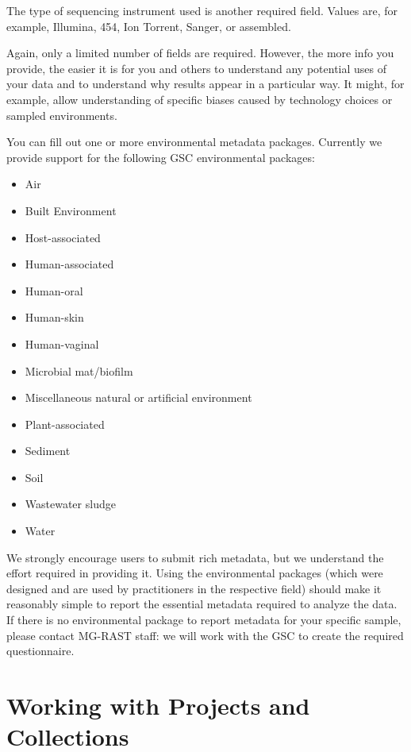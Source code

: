 \documentclass[12pt,fullpage]{report}
\begin{document}
The type of sequencing instrument used is another required field. Values are, for example, Illumina, 454, Ion Torrent, Sanger, or assembled.

Again, only a limited number of fields are required. However, the more info you provide, the easier it is for you and others to understand any potential uses of your data and to understand why results appear in a particular way. It might, for example, allow understanding of specific biases caused by technology choices or sampled environments.

You can fill out one or more environmental metadata packages.  Currently we provide support for the following GSC environmental packages:

\begin{itemize}
\item Air
\item Built Environment
\item Host-associated
\item Human-associated
\item Human-oral
\item Human-skin
\item Human-vaginal
\item Microbial mat/biofilm
\item Miscellaneous natural or artificial environment
\item Plant-associated
\item Sediment
\item Soil
\item Wastewater sludge
\item Water
\end{itemize}

We strongly encourage users to submit rich metadata, but we understand the effort required in providing it. Using the environmental packages (which were designed and are used by practitioners in the respective field) should make it reasonably simple to report the essential metadata required to analyze the data. If there is no environmental package to report metadata for your specific sample, please contact MG-RAST staff: we will work with the GSC\cite{GSC} to create the required questionnaire.


 

 \section{Working with Projects and Collections}
\end{document}
